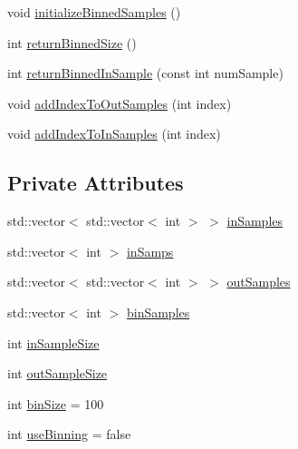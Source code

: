 \begin{DoxyCompactItemize}
void \hyperlink{classfp_1_1stratifiedInNodeClassIndices_ae9907f8984615f91417fb7961e1b582d}{initialize\+Binned\+Samples} ()
\item 
int \hyperlink{classfp_1_1stratifiedInNodeClassIndices_a9f77fe5e638170c4ad4ce99541561cfc}{return\+Binned\+Size} ()
\item 
int \hyperlink{classfp_1_1stratifiedInNodeClassIndices_a775d9a820b6f48ab44cd1ac4ffde1578}{return\+Binned\+In\+Sample} (const int num\+Sample)
\item 
void \hyperlink{classfp_1_1stratifiedInNodeClassIndices_adc99a046031545bc59c2b43abcf75ed9}{add\+Index\+To\+Out\+Samples} (int index)
\item 
void \hyperlink{classfp_1_1stratifiedInNodeClassIndices_a493b23961e38f5f534c236a22b4ff4b6}{add\+Index\+To\+In\+Samples} (int index)
\end{DoxyCompactItemize}
\subsection*{Private Attributes}
\begin{DoxyCompactItemize}
\item 
std\+::vector$<$ std\+::vector$<$ int $>$ $>$ \hyperlink{classfp_1_1stratifiedInNodeClassIndices_a6bfa636c77b48163f5d245959ea753d0}{in\+Samples}
\item 
std\+::vector$<$ int $>$ \hyperlink{classfp_1_1stratifiedInNodeClassIndices_ab6be4d82677c462494a4b4ef90c79bde}{in\+Samps}
\item 
std\+::vector$<$ std\+::vector$<$ int $>$ $>$ \hyperlink{classfp_1_1stratifiedInNodeClassIndices_aa569f727e65e0b4b0815e71c1ee819e8}{out\+Samples}
\item 
std\+::vector$<$ int $>$ \hyperlink{classfp_1_1stratifiedInNodeClassIndices_a399e239f3f3175e44ca409be96de0d32}{bin\+Samples}
\item 
int \hyperlink{classfp_1_1stratifiedInNodeClassIndices_a2acb617e3212806ae7f994d925bd1468}{in\+Sample\+Size}
\item 
int \hyperlink{classfp_1_1stratifiedInNodeClassIndices_aa947b545e6751902344e832fcc1c9641}{out\+Sample\+Size}
\item 
int \hyperlink{classfp_1_1stratifiedInNodeClassIndices_aeb008fe5e4d29845a675175590ef2de3}{bin\+Size} = 100
\item 
int \hyperlink{classfp_1_1stratifiedInNodeClassIndices_af6ca8b8a4539b8c35008cce88961fa00}{use\+Binning} = false
\end{DoxyCompactItemize}


